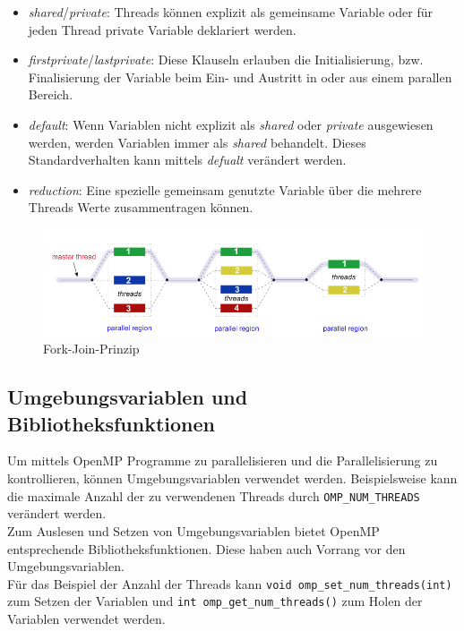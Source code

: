 \documentclass[11pt]{scrartcl}
\begin{document}
\begin{itemize}
\item \textit{shared}/\textit{private}: Threads können explizit als gemeinsame Variable oder für jeden Thread private Variable deklariert werden.
\item \textit{firstprivate}/\textit{lastprivate}: Diese Klauseln erlauben die Initialisierung, bzw. Finalisierung der Variable beim Ein- und Austritt in oder aus einem parallen Bereich.
\item \textit{default}: Wenn Variablen nicht explizit als \textit{shared} oder \textit{private} ausgewiesen werden, werden Variablen immer als \textit{shared} behandelt. Dieses Standardverhalten kann mittels \textit{defualt} verändert werden. \item \textit{reduction}: Eine spezielle gemeinsam genutzte Variable über die mehrere Threads Werte zusammentragen können.
\end{itemize}


\begin{figure}[h!]	
\centering
\includegraphics[width=1.0\textwidth]{img/fork_join.png}
\caption{Fork-Join-Prinzip}
\label{join_fork_model}
\end{figure} 

\subsection{Umgebungsvariablen und Bibliotheksfunktionen}

Um mittels OpenMP Programme zu parallelisieren und die Parallelisierung zu kontrollieren, können Umgebungsvariablen verwendet werden. Beispielsweise kann die maximale Anzahl der zu verwendenen Threads durch \texttt{OMP\_NUM\_THREADS} verändert werden.\\ 
Zum Auslesen und Setzen von Umgebungsvariablen bietet OpenMP entsprechende Bibliotheksfunktionen. Diese haben auch Vorrang vor den Umgebungsvariablen.\\
Für das Beispiel der Anzahl der Threads kann \texttt{void omp\_set\_num\_threads(int)} zum Setzen der Variablen und \texttt{int omp\_get\_num\_threads()} zum Holen der Variablen verwendet werden.
\end{document}
